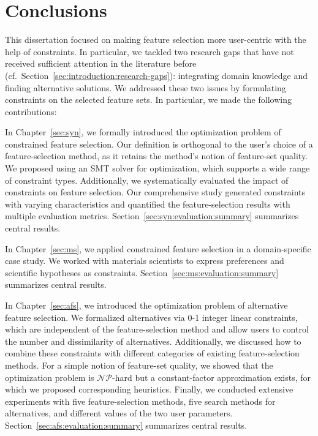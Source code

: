 \chapter{Conclusions}
\label{sec:conclusions}

This dissertation focused on making feature selection more user-centric with the help of constraints.
In particular, we tackled two research gaps that have not received sufficient attention in the literature before (cf.~Section~\ref{sec:introduction:research-gaps}):
integrating domain knowledge and finding alternative solutions.
We addressed these two issues by formulating constraints on the selected feature sets.
In particular, we made the following contributions:

In Chapter~\ref{sec:syn}, we formally introduced the optimization problem of constrained feature selection.
Our definition is orthogonal to the user's choice of a feature-selection method, as it retains the method's notion of feature-set quality.
We proposed using an SMT solver for optimization, which supports a wide range of constraint types.
Additionally, we systematically evaluated the impact of constraints on feature selection.
Our comprehensive study generated constraints with varying characteristics and quantified the feature-selection results with multiple evaluation metrics.
Section~\ref{sec:syn:evaluation:summary} summarizes central results.

In Chapter~\ref{sec:ms}, we applied constrained feature selection in a domain-specific case study.
We worked with materials scientists to express preferences and scientific hypotheses as constraints.
Section~\ref{sec:ms:evaluation:summary} summarizes central results.

In Chapter~\ref{sec:afs}, we introduced the optimization problem of alternative feature selection.
We formalized alternatives via 0-1 integer linear constraints, which are independent of the feature-selection method and allow users to control the number and dissimilarity of alternatives.
Additionally, we discussed how to combine these constraints with different categories of existing feature-selection methods.
For a simple notion of feature-set quality, we showed that the optimization problem is $\mathcal{NP}$-hard but a constant-factor approximation exists, for which we proposed corresponding heuristics.
Finally, we conducted extensive experiments with five feature-selection methods, five search methods for alternatives, and different values of the two user parameters.
Section~\ref{sec:afs:evaluation:summary} summarizes central results.

